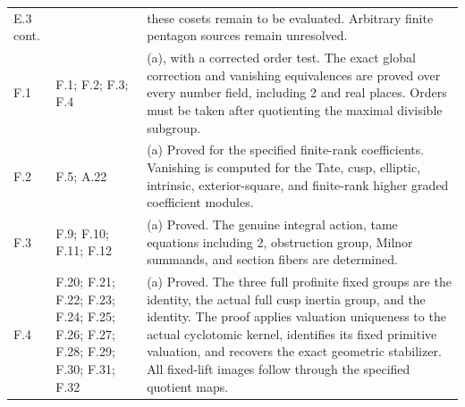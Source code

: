 \begin{longtable}{@{}p{1.1cm}p{3.0cm}p{10.3cm}@{}}
E.3 cont. &  & these cosets remain to be evaluated. Arbitrary finite pentagon sources remain unresolved. \\
F.1 & F.1; F.2; F.3; F.4 & (a), with a corrected order test. The exact global correction and vanishing equivalences are proved over every number field, including 2 and real places. Orders must be taken after quotienting the maximal divisible subgroup. \\
F.2 & F.5; A.22 & (a) Proved for the specified finite-rank coefficients. Vanishing is computed for the Tate, cusp, elliptic, intrinsic, exterior-square, and finite-rank higher graded coefficient modules. \\
F.3 & F.9; F.10; F.11; F.12 & (a) Proved. The genuine integral action, tame equations including 2, obstruction group, Milnor summands, and section fibers are determined. \\
F.4 & F.20; F.21; F.22; F.23; F.24; F.25; F.26; F.27; F.28; F.29; F.30; F.31; F.32 & (a) Proved. The three full profinite fixed groups are the identity, the actual full cusp inertia group, and the identity. The proof applies valuation uniqueness to the actual cyclotomic kernel, identifies its fixed primitive valuation, and recovers the exact geometric stabilizer. All fixed-lift images follow through the specified quotient maps. \\
\bottomrule\end{longtable}
